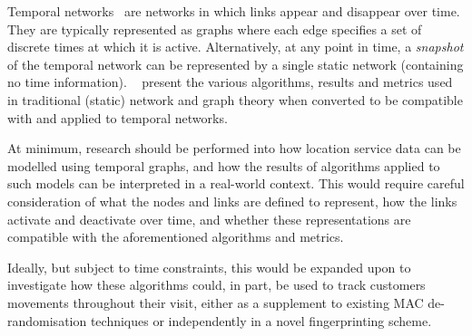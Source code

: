 Temporal networks~\cite{kempe2002connectivity} are networks in which links appear and disappear over time.
They are typically represented as graphs where each edge specifies a set of discrete times at which it is active.
Alternatively, at any point in time, a \textit{snapshot} of the temporal network can be represented by a single static network (containing no time information).
~\cite{kempe2002connectivity,akrida2015temporally,erlebach2021temporal} present the various algorithms, results and metrics used in traditional (static) network and graph theory when converted to be compatible with and applied to temporal networks.

At minimum, research should be performed into how location service data can be modelled using temporal graphs, and how the results of algorithms applied to such models can be interpreted in a real-world context.
This would require careful consideration of what the nodes and links are defined to represent, how the links activate and deactivate over time, and whether these representations are compatible with the aforementioned algorithms and metrics.

Ideally, but subject to time constraints, this would be expanded upon to investigate how these algorithms could, in part, be used to track customers movements throughout their visit, either as a supplement to existing MAC de-randomisation techniques or independently in a novel fingerprinting scheme.
